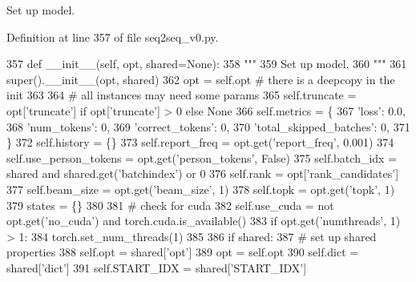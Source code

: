 \begin{DoxyVerb}Set up model.
\end{DoxyVerb}
 

Definition at line 357 of file seq2seq\+\_\+v0.\+py.


\begin{DoxyCode}
357     \textcolor{keyword}{def }\_\_init\_\_(self, opt, shared=None):
358         \textcolor{stringliteral}{"""}
359 \textcolor{stringliteral}{        Set up model.}
360 \textcolor{stringliteral}{        """}
361         super().\_\_init\_\_(opt, shared)
362         opt = self.opt  \textcolor{comment}{# there is a deepcopy in the init}
363 
364         \textcolor{comment}{# all instances may need some params}
365         self.truncate = opt[\textcolor{stringliteral}{'truncate'}] \textcolor{keywordflow}{if} opt[\textcolor{stringliteral}{'truncate'}] > 0 \textcolor{keywordflow}{else} \textcolor{keywordtype}{None}
366         self.metrics = \{
367             \textcolor{stringliteral}{'loss'}: 0.0,
368             \textcolor{stringliteral}{'num\_tokens'}: 0,
369             \textcolor{stringliteral}{'correct\_tokens'}: 0,
370             \textcolor{stringliteral}{'total\_skipped\_batches'}: 0,
371         \}
372         self.history = \{\}
373         self.report\_freq = opt.get(\textcolor{stringliteral}{'report\_freq'}, 0.001)
374         self.use\_person\_tokens = opt.get(\textcolor{stringliteral}{'person\_tokens'}, \textcolor{keyword}{False})
375         self.batch\_idx = shared \textcolor{keywordflow}{and} shared.get(\textcolor{stringliteral}{'batchindex'}) \textcolor{keywordflow}{or} 0
376         self.rank = opt[\textcolor{stringliteral}{'rank\_candidates'}]
377         self.beam\_size = opt.get(\textcolor{stringliteral}{'beam\_size'}, 1)
378         self.topk = opt.get(\textcolor{stringliteral}{'topk'}, 1)
379         states = \{\}
380 
381         \textcolor{comment}{# check for cuda}
382         self.use\_cuda = \textcolor{keywordflow}{not} opt.get(\textcolor{stringliteral}{'no\_cuda'}) \textcolor{keywordflow}{and} torch.cuda.is\_available()
383         \textcolor{keywordflow}{if} opt.get(\textcolor{stringliteral}{'numthreads'}, 1) > 1:
384             torch.set\_num\_threads(1)
385 
386         \textcolor{keywordflow}{if} shared:
387             \textcolor{comment}{# set up shared properties}
388             self.opt = shared[\textcolor{stringliteral}{'opt'}]
389             opt = self.opt
390             self.dict = shared[\textcolor{stringliteral}{'dict'}]
391             self.START\_IDX = shared[\textcolor{stringliteral}{'START\_IDX'}]

\end{DoxyCode}
